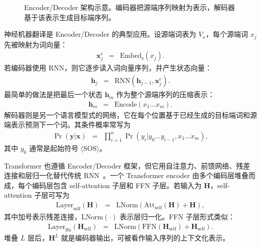 
\begin{figure}[htbp]
  \centering
  
  \caption{Encoder/Decoder 架构示意。编码器把源端序列映射为表示，解码器基于该表示生成目标端序列。}
  \label{fig:nlpbook-encoder-decoder}
\end{figure}

神经机器翻译是 Encoder/Decoder 的典型应用。设源端词表为 $V_x$，每个源端词 $x_j$ 先被映射为词向量：
\begin{eqnarray}
\mathbf{x}_j^{e}
& = &
\mathrm{Embed}_{\mathrm{s}}(x_j).
\end{eqnarray}
若编码器使用 RNN，则它逐步读入词向量序列，并产生状态向量：
\begin{eqnarray}
\mathbf{h}_j
& = &
\mathrm{RNN}(\mathbf{h}_{j-1},\mathbf{x}_j^{e}).
\end{eqnarray}
最简单的做法是把最后一个状态 $\mathbf{h}_m$ 作为整个源端序列的压缩表示：
\begin{eqnarray}
\mathbf{h}_m
& = &
\mathrm{Encode}(x_1\ldots x_m).
\end{eqnarray}
解码器则是另一个语言模型式的网络，它在每个位置基于已经生成的目标端词和源端表示预测下一个词。其条件概率常写为
\begin{eqnarray}
\Pr(\mathbf{y}|\mathbf{x})
& = &
\prod_{i=1}^{n}
\Pr(y_i|y_0\ldots y_{i-1},x_1\ldots x_m),
\end{eqnarray}
\noindent 其中 $y_0$ 通常是起始符号 $\langle \mathrm{SOS} \rangle$。

Transformer 也遵循 Encoder/Decoder 框架，但它用自注意力、前馈网络、残差连接和层归一化替代传统 RNN~\cite{HeEtAl2016ResNet,BaEtAl2016LayerNorm,VaswaniEtAl2017Transformer}。一个 Transformer encoder 由多个编码层堆叠而成，每个编码层包含 self-attention 子层和 FFN 子层。若输入为 $\mathbf{H}$，self-attention 子层可写为
\begin{eqnarray}
\mathrm{Layer}_{\mathrm{self}}(\mathbf{H})
& = &
\mathrm{LNorm}
(
\mathrm{Att}_{\mathrm{self}}(\mathbf{H})+\mathbf{H}
),
\end{eqnarray}
\noindent 其中加号表示残差连接，$\mathrm{LNorm}(\cdot)$ 表示层归一化。FFN 子层形式类似：
\begin{eqnarray}
\mathrm{Layer}_{\mathrm{ffn}}(\mathbf{H}_{\mathrm{self}})
& = &
\mathrm{LNorm}
(
\mathrm{FFN}(\mathbf{H}_{\mathrm{self}})
+\mathbf{H}_{\mathrm{self}}
).
\end{eqnarray}
堆叠 $L$ 层后，$\mathbf{H}^{L}$ 就是编码器输出，可被看作输入序列的上下文化表示。

